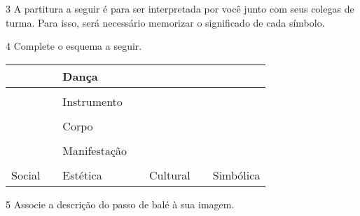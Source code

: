 \num{3}  A partitura a seguir é para ser interpretada por você junto com seus
  colegas de turma. Para isso, será necessário memorizar o significado
  de cada símbolo.




\num{4}  Complete o esquema a seguir.


\begin{longtable}[]{@{}lllllll@{}}
\toprule
& & \textbf{Dança} & & &\tabularnewline
\midrule
\endhead
& & & & & &\tabularnewline
& & Instrumento & & &\tabularnewline
& & & & & &\tabularnewline
& & Corpo & & &\tabularnewline
& & & & & &\tabularnewline
& & Manifestação & &\tabularnewline
& & & & & &\tabularnewline
Social & & Estética & & Cultural & & Simbólica\tabularnewline
\bottomrule
\end{longtable}


\num{5}  Associe a descrição do passo de balé à sua imagem.


